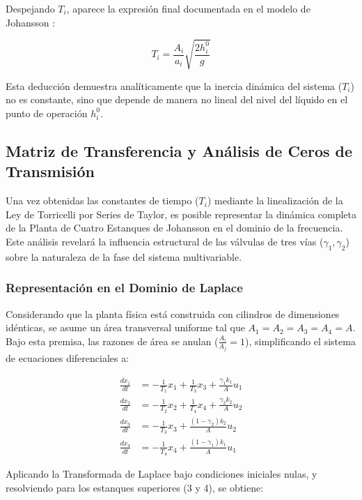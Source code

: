 Despejando $T_i$, aparece la expresión final documentada en el modelo de Johansson \cite{johansson2000}:

\begin{equation}
T_i = \frac{A_i}{a_i} \sqrt{\frac{2 h_i^0}{g}}
\label{eq:ti_final}
\end{equation}

Esta deducción demuestra analíticamente que la inercia dinámica del sistema ($T_i$) no es constante, sino que depende de manera no lineal del nivel del líquido en el punto de operación $h_i^0$.

\subsection{Matriz de Transferencia y Análisis de Ceros de Transmisión}

Una vez obtenidas las constantes de tiempo ($T_i$) mediante la linealización de la Ley de Torricelli por Series de Taylor, es posible representar la dinámica completa de la Planta de Cuatro Estanques de Johansson en el dominio de la frecuencia. Este análisis revelará la influencia estructural de las válvulas de tres vías ($\gamma_1, \gamma_2$) sobre la naturaleza de la fase del sistema multivariable.

\subsubsection{Representación en el Dominio de Laplace}
Considerando que la planta física está construida con cilindros de dimensiones idénticas, se asume un área transversal uniforme tal que $A_1 = A_2 = A_3 = A_4 = A$. Bajo esta premisa, las razones de área se anulan ($\frac{A_i}{A_j} = 1$), simplificando el sistema de ecuaciones diferenciales a:

\begin{align}
\frac{dx_1}{dt} &= -\frac{1}{T_1} x_1 + \frac{1}{T_3} x_3 + \frac{\gamma_1 k_1}{A} u_1 \label{eq:dx1_dt_simp} \\
\frac{dx_2}{dt} &= -\frac{1}{T_2} x_2 + \frac{1}{T_4} x_4 + \frac{\gamma_2 k_2}{A} u_2 \label{eq:dx2_dt_simp} \\
\frac{dx_3}{dt} &= -\frac{1}{T_3} x_3 + \frac{(1-\gamma_2) k_2}{A} u_2 \label{eq:dx3_dt_simp} \\
\frac{dx_4}{dt} &= -\frac{1}{T_4} x_4 + \frac{(1-\gamma_1) k_1}{A} u_1 \label{eq:dx4_dt_simp}
\end{align}

Aplicando la Transformada de Laplace bajo condiciones iniciales nulas, y resolviendo para los estanques superiores (3 y 4), se obtiene:

